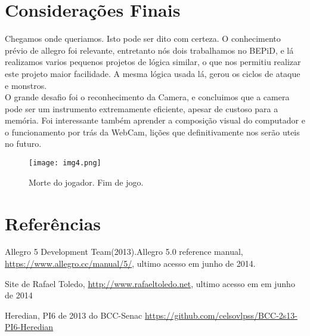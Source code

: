 \documentclass[12pt]{article}
\begin{document}
\section{Considerações Finais}

Chegamos onde queriamos. Isto pode ser dito com certeza.
O conhecimento prévio de allegro foi relevante, entretanto nós dois trabalhamos no BEPiD, e lá realizamos varios pequenos projetos de lógica similar, o que nos permitiu realizar este projeto maior facilidade. A mesma lógica usada lá, gerou os ciclos de ataque e monstros.\\
O grande desafio foi o reconhecimento da Camera, e concluimos que a camera pode ser um instrumento extremamente eficiente, apesar de custoso para a memória. Foi interessante também aprender a composição visual do computador e o funcionamento por trás da WebCam, lições que definitivamente nos serão uteis no futuro.


\begin{figure}[ht!]
\centering
\texttt{[image: img4.png]}
\caption{Morte do jogador. Fim de jogo.}
\label{fig:img4}
\end{figure}

\section*{Referências}
Allegro 5 Development Team(2013).Allegro 5.0 reference manual, \url{https://www.allegro.cc/manual/5/}, ultimo acesso em junho de 2014.

Site de Rafael Toledo, \url{http://www.rafaeltoledo.net}, ultimo acesso em em junho de 2014

Heredian, PI6 de 2013 do BCC-Senac
\url{https://github.com/celsovlpss/BCC-2s13-PI6-Heredian}
\end{document}
